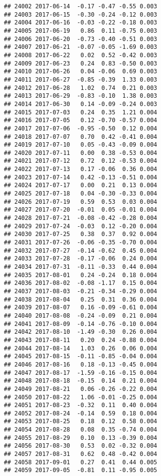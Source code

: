 \documentclass[
]{article}
\begin{document}
\begin{verbatim}
## 24002 2017-06-14  -0.17 -0.47 -0.55 0.003
## 24003 2017-06-15  -0.30 -0.24 -0.12 0.003
## 24004 2017-06-16  -0.03 -0.22 -0.18 0.003
## 24005 2017-06-19   0.86  0.11 -0.75 0.003
## 24006 2017-06-20  -0.73 -0.40 -0.51 0.003
## 24007 2017-06-21  -0.07 -0.05 -1.69 0.003
## 24008 2017-06-22   0.02  0.52 -0.42 0.003
## 24009 2017-06-23   0.24  0.83 -0.50 0.003
## 24010 2017-06-26   0.04 -0.06  0.69 0.003
## 24011 2017-06-27  -0.85 -0.39  1.33 0.003
## 24012 2017-06-28   1.02  0.74  0.21 0.003
## 24013 2017-06-29  -0.83 -0.10  1.38 0.003
## 24014 2017-06-30   0.14 -0.09 -0.24 0.003
## 24015 2017-07-03   0.24  0.35  1.21 0.004
## 24016 2017-07-05   0.12 -0.70 -0.57 0.004
## 24017 2017-07-06  -0.95 -0.50  0.12 0.004
## 24018 2017-07-07   0.70  0.42 -0.41 0.004
## 24019 2017-07-10   0.05 -0.43 -0.09 0.004
## 24020 2017-07-11   0.00  0.38 -0.53 0.004
## 24021 2017-07-12   0.72  0.12 -0.53 0.004
## 24022 2017-07-13   0.17 -0.06  0.36 0.004
## 24023 2017-07-14   0.42 -0.13 -0.51 0.004
## 24024 2017-07-17   0.00  0.21  0.13 0.004
## 24025 2017-07-18   0.04 -0.30 -0.33 0.004
## 24026 2017-07-19   0.59  0.53  0.03 0.004
## 24027 2017-07-20  -0.01  0.05 -0.01 0.004
## 24028 2017-07-21  -0.08 -0.42 -0.28 0.004
## 24029 2017-07-24  -0.03  0.12 -0.20 0.004
## 24030 2017-07-25   0.38  0.37  0.92 0.004
## 24031 2017-07-26  -0.06 -0.35 -0.70 0.004
## 24032 2017-07-27  -0.14 -0.62  0.45 0.004
## 24033 2017-07-28  -0.17 -0.06  0.24 0.004
## 24034 2017-07-31  -0.11 -0.33  0.44 0.004
## 24035 2017-08-01   0.24 -0.24  0.18 0.004
## 24036 2017-08-02  -0.08 -1.17  0.15 0.004
## 24037 2017-08-03  -0.21 -0.34 -0.29 0.004
## 24038 2017-08-04   0.25  0.31  0.36 0.004
## 24039 2017-08-07   0.16 -0.09 -0.61 0.004
## 24040 2017-08-08  -0.24 -0.09  0.21 0.004
## 24041 2017-08-09  -0.14 -0.76 -0.10 0.004
## 24042 2017-08-10  -1.49 -0.30  0.26 0.004
## 24043 2017-08-11   0.20  0.24 -0.88 0.004
## 24044 2017-08-14   1.03  0.26  0.06 0.004
## 24045 2017-08-15  -0.11 -0.85 -0.04 0.004
## 24046 2017-08-16   0.18 -0.13 -0.45 0.004
## 24047 2017-08-17  -1.59 -0.16 -0.15 0.004
## 24048 2017-08-18  -0.15  0.14  0.21 0.004
## 24049 2017-08-21   0.06 -0.26 -0.22 0.004
## 24050 2017-08-22   1.06 -0.01 -0.25 0.004
## 24051 2017-08-23  -0.32  0.11  0.40 0.004
## 24052 2017-08-24  -0.14  0.59  0.18 0.004
## 24053 2017-08-25   0.18  0.12  0.58 0.004
## 24054 2017-08-28   0.08  0.35 -0.74 0.004
## 24055 2017-08-29   0.10  0.13 -0.39 0.004
## 24056 2017-08-30   0.53  0.02 -0.32 0.004
## 24057 2017-08-31   0.62  0.48 -0.42 0.004
## 24058 2017-09-01   0.27  0.41  0.44 0.005
## 24059 2017-09-05  -0.81  0.11 -0.95 0.005

\end{verbatim}
\end{document}
